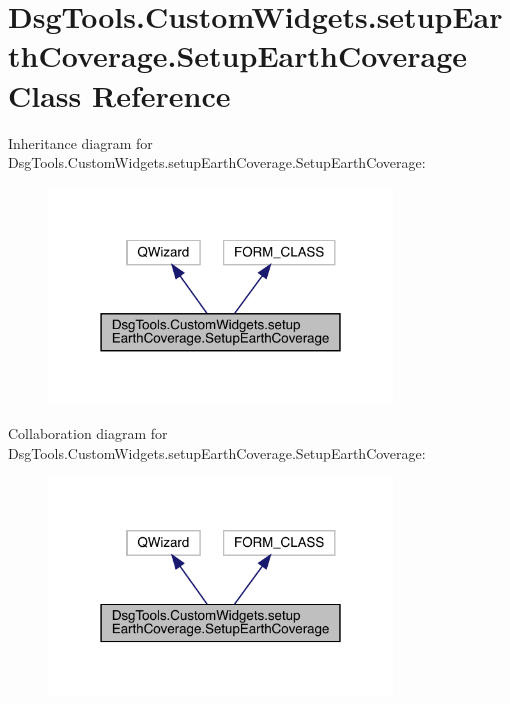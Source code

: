 \hypertarget{class_dsg_tools_1_1_custom_widgets_1_1setup_earth_coverage_1_1_setup_earth_coverage}{}\section{Dsg\+Tools.\+Custom\+Widgets.\+setup\+Earth\+Coverage.\+Setup\+Earth\+Coverage Class Reference}
\label{class_dsg_tools_1_1_custom_widgets_1_1setup_earth_coverage_1_1_setup_earth_coverage}


Inheritance diagram for Dsg\+Tools.\+Custom\+Widgets.\+setup\+Earth\+Coverage.\+Setup\+Earth\+Coverage\+:
\nopagebreak
\begin{figure}[H]
\begin{center}
\leavevmode
\includegraphics[width=259pt]{class_dsg_tools_1_1_custom_widgets_1_1setup_earth_coverage_1_1_setup_earth_coverage__inherit__graph}
\end{center}
\end{figure}


Collaboration diagram for Dsg\+Tools.\+Custom\+Widgets.\+setup\+Earth\+Coverage.\+Setup\+Earth\+Coverage\+:
\nopagebreak
\begin{figure}[H]
\begin{center}
\leavevmode
\includegraphics[width=259pt]{class_dsg_tools_1_1_custom_widgets_1_1setup_earth_coverage_1_1_setup_earth_coverage__coll__graph}
\end{center}
\end{figure}
